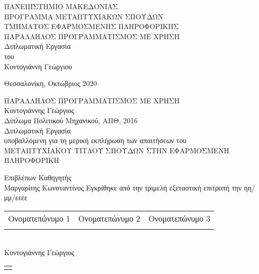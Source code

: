 \begin{center}

\textsc{ ΠΑΝΕΠΙΣΤΗΜΙΟ ΜΑΚΕΔΟΝΙΑΣ\\[0.3 cm]
ΠΡΟΓΡΑΜΜΑ ΜΕΤΑΠΤΥΧΙΑΚΩΝ ΣΠΟΥΔΩΝ\\[0.3 cm]
ΤΜΗΜΑΤΟΣ ΕΦΑΡΜΟΣΜΕΝΗΣ ΠΛΗΡΟΦΟΡΙΚΗΣ}\\[2.5 cm]
{ \large 
ΠΑΡΑΛΛΗΛΟΣ ΠΡΟΓΡΑΜΜΑΤΙΣΜΟΣ ΜΕ ΧΡΗΣΗ \\[0.4 cm] }
Διπλωματική Εργασία\\[1 cm]
του\\[0.5 cm]
\large
Κοντογιάννη Γεώργιου
\begin{minipage}{0.4\textwidth}
\end{minipage}
\vfill
{\large Θεσσαλονίκη, Οκτώβριος 2020}

 \end{center}
 
\newpage
\mbox{}


\newpage
{}
\setcounter{page}{3} 

 \begin{center}
{\large {ΠΑΡΑΛΛΗΛΟΣ ΠΡΟΓΡΑΜΜΑΤΙΣΜΟΣ ΜΕ ΧΡΗΣΗ }}\\[2 cm]
Κοντογιάννης Γεώργιος\\[0.5 cm]
Δίπλωμα Πολιτικού Μηχανικού, ΑΠΘ, 2016\\[2 cm]
Διπλωματική Εργασία\\[0.5 cm]
υποβαλλόμενη για τη μερική εκπλήρωση των απαιτήσεων του\\[0.5 cm]
ΜΕΤΑΠΤΥΧΙΑΚΟΥ ΤΙΤΛΟΥ ΣΠΟΥΔΩΝ ΣΤΗΝ ΕΦΑΡΜΟΣΜΕΝΗ ΠΛΗΡΟΦΟΡΙΚΗ\\[2 cm]
\begin{flushleft}
Επιβλέπων Καθηγητής\\
Μαργαρίτης Κωνσταντίνος
\vfill
Εγκρίθηκε από την τριμελή εξεταστική επιτροπή την ηη/μμ/εεεε\\[0.5 cm]
\begin{tabular}{  p{} 
                   p{} 
                   p{}  }
Ονοματεπώνυμο 1 & Ονοματεπώνυμο 2  & Ονοματεπώνυμο 3 \\[1 cm]
\dotfill & \dotfill  & \dotfill \\
\end{tabular}\\[2 cm]
Κοντογιάννης Γεώργιος \\[0.5 cm]
\begin{tabular}{  p{}   }
\dotfill
\end{tabular}\\[1 cm]
\end{flushleft}
\end{center}
  

